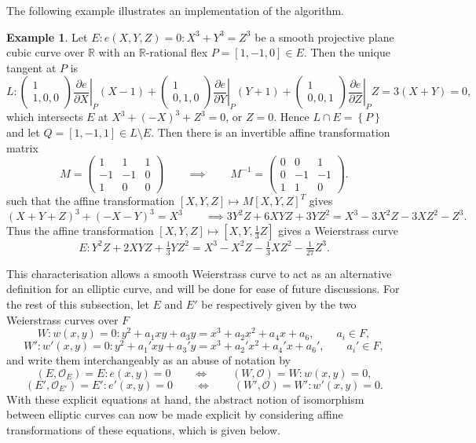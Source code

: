\documentclass{article}
\newcommand{\R}{\mathbb{R}}
\newcommand{\val}[1]{\left. #1 \right\rvert}
\newcommand{\rb}[1]{\left( #1 \right)}
\renewcommand{\sb}[1]{\left[ #1 \right]}
\newcommand{\cb}[1]{\left\{ #1 \right\}}
\newcommand{\two}[2]{\begin{pmatrix} #1 \\ #2 \end{pmatrix}}
\theoremstyle{definition}\newtheorem*{definition}{Definition}
\theoremstyle{definition}\newtheorem*{example}{Example}
\theoremstyle{definition}\newtheorem*{remark}{Remark}
\begin{document}
The following example illustrates an implementation of the algorithm.

\begin{example}
Let $ E : e\rb{X, Y, Z} = 0 : X^3 + Y^3 = Z^3 $ be a smooth projective plane cubic curve over $ \R $ with an $ \R $-rational flex $ P = \sb{1, -1, 0} \in E $. Then the unique tangent at $ P $ is
$$ L : \two{1}{1, 0, 0}\val{\dfrac{\partial e}{\partial X}}_P\rb{X - 1} + \two{1}{0, 1, 0}\val{\dfrac{\partial e}{\partial Y}}_P\rb{Y + 1} + \two{1}{0, 0, 1}\val{\dfrac{\partial e}{\partial Z}}_PZ = 3\rb{X + Y} = 0, $$
which intersects $ E $ at $ X^3 + \rb{-X}^3 + Z^3 = 0 $, or $ Z = 0 $. Hence $ L \cap E = \cb{P} $ and let $ Q = \sb{1, -1, 1} \in L \setminus E $. Then there is an invertible affine transformation matrix
$$ M = \begin{pmatrix} 1 & 1 & 1 \\ -1 & -1 & 0 \\ 1 & 0 & 0 \end{pmatrix} \qquad \implies \qquad M^{-1} = \begin{pmatrix} 0 & 0 & 1 \\ 0 & -1 & -1 \\ 1 & 1 & 0 \end{pmatrix}. $$
such that the affine transformation $ \sb{X, Y, Z} \mapsto M\sb{X, Y, Z}^{T} $ gives
$$ \rb{X + Y + Z}^3 + \rb{-X - Y}^3 = X^3 \qquad \implies 3Y^2Z + 6XYZ + 3YZ^2 = X^3 - 3X^2Z - 3XZ^2 - Z^3. $$
Thus the affine transformation $ \sb{X, Y, Z} \mapsto \sb{X, Y, \tfrac{1}{3}Z} $ gives a Weierstrass curve
$$ E : Y^2Z + 2XYZ + \tfrac{1}{3}YZ^2 = X^3 - X^2Z - \tfrac{1}{3}XZ^2 - \tfrac{1}{27}Z^3. $$
\end{example}

This characterisation allows a smooth Weierstrass curve to act as an alternative definition for an elliptic curve, and will be done for ease of future discussions. For the rest of this subsection, let $ E $ and $ E' $ be respectively given by the two Weierstrass curves over $ F $
$$ W : w\rb{x, y} = 0 : y^2 + a_1xy + a_3y = x^3 + a_2x^2 + a_4x + a_6, \qquad a_i \in F, $$
$$ W' : w'\rb{x, y} = 0 : y^2 + a_1'xy + a_3'y = x^3 + a_2'x^2 + a_4'x + a_6', \qquad a_i' \in F, $$
and write them interchangeably as an abuse of notation by
$$ \rb{E, \mathcal{O}_E} = E : e\rb{x, y} = 0 \qquad \iff \qquad \rb{W, \mathcal{O}} = W : w\rb{x, y} = 0, $$
$$ \rb{E', \mathcal{O}_{E'}} = E' : e'\rb{x, y} = 0 \qquad \iff \qquad \rb{W', \mathcal{O}} = W' : w'\rb{x, y} = 0. $$
With these explicit equations at hand, the abstract notion of isomorphism between elliptic curves can now be made explicit by considering affine transformations of these equations, which is given below.
\end{document}
